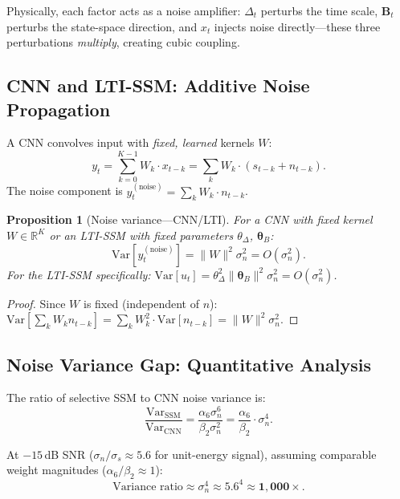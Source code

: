 \documentclass[journal]{IEEEtran}
\newtheorem{proposition}{Proposition}
\begin{document}
Physically, each factor acts as a noise amplifier: $\Delta_t$ perturbs the time scale, $\mathbf{B}_t$ perturbs the state-space direction, and $x_t$ injects noise directly---these three perturbations \emph{multiply}, creating cubic coupling.

\subsection{CNN and LTI-SSM: Additive Noise Propagation}
\label{sec:add_noise}

A CNN convolves input with \emph{fixed, learned} kernels $W$:
\begin{equation}
y_t = \sum_{k=0}^{K-1} W_k \cdot x_{t-k} = \sum_k W_k \cdot (s_{t-k} + n_{t-k}).
\label{eq:cnn_full}
\end{equation}
The noise component is $y_t^{(\text{noise})} = \sum_k W_k \cdot n_{t-k}$.

\begin{proposition}[Noise variance---CNN/LTI]
\label{prop:var_cnn}
For a CNN with fixed kernel $W \in \mathbb{R}^K$ or an LTI-SSM with fixed parameters $\theta_\Delta$, $\bm{\theta}_B$:
\begin{equation}
\mathrm{Var}[y_t^{(\text{noise})}] = \|W\|^2 \sigma_n^2 = O(\sigma_n^2).
\label{eq:var_cnn}
\end{equation}
For the LTI-SSM specifically: $\mathrm{Var}[u_t] = \theta_\Delta^2 \|\bm{\theta}_B\|^2 \sigma_n^2 = O(\sigma_n^2)$.
\end{proposition}

\begin{proof}
Since $W$ is fixed (independent of $n$): $\mathrm{Var}[\sum_k W_k n_{t-k}] = \sum_k W_k^2 \cdot \mathrm{Var}[n_{t-k}] = \|W\|^2 \sigma_n^2$.
\end{proof}

\subsection{Noise Variance Gap: Quantitative Analysis}
\label{sec:gap}

The ratio of selective SSM to CNN noise variance is:
\begin{equation}
\frac{\mathrm{Var}_{\text{SSM}}}{\mathrm{Var}_{\text{CNN}}} = \frac{\alpha_6 \sigma_n^6}{\beta_2 \sigma_n^2} = \frac{\alpha_6}{\beta_2} \cdot \sigma_n^4.
\label{eq:ratio}
\end{equation}

At $-15$\,dB SNR ($\sigma_n / \sigma_s \approx 5.6$ for unit-energy signal), assuming comparable weight magnitudes ($\alpha_6 / \beta_2 \approx 1$):
\begin{equation}
\text{Variance ratio} \approx \sigma_n^4 \approx 5.6^4 \approx \mathbf{1{,}000\times}.
\label{eq:1000x}
\end{equation}
\end{document}

